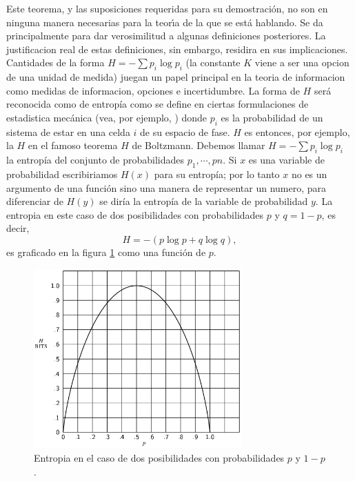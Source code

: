 Este teorema, y las suposiciones requeridas para su demostraci\'{o}n,
no son en ninguna manera necesarias para la teor\'{\i}a de la que se
est\'{a} hablando.  Se da principalmente para dar verosimilitud a
algunas definiciones posteriores. La justificacion real de estas
definiciones, sin embargo, residira en sus implicaciones. Cantidades
de la forma $H = -\sum p_{i} \log p_{i}$ (la constante $K$ viene a ser
una opcion de una unidad de medida) juegan un papel principal en la
teoria de informacion como medidas de informacion, opciones e
incertidumbre. La forma de $H$ ser\'{a} reconocida como de
entrop\'{i}a como se define en ciertas formulaciones de estadistica
mec\'{a}nica (vea, por ejemplo, \citet{tolman}) donde $p_{i}$ es la
probabilidad de un sistema de estar en una celda $i$ de su espacio de
fase. $H$ es entonces, por ejemplo, la $H$ en el famoso teorema $H$ de
Boltzmann. Debemos llamar $H = -\sum p_{i} \log{p_{i}}$ la
entrop\'{i}a del conjunto de probabilidades $p_{1}, \cdots,p{n}$. Si
$x$ es una variable de probabilidad escribiriamos $H(x)$ para su
entrop\'{i}a; por lo tanto $x$ no es un argumento de una funci\'{o}n
sino una manera de representar un numero, para diferenciar de $H(y)$
se dir\'{i}a la entrop\'{i}a de la variable de probabilidad $y$.  La
entropia en este caso de dos posibilidades con probabilidades $p$ y $q
= 1 - p$, es decir,
\begin{equation}
H = -(p \log p + q \log q),
\end{equation}
es graficado en la figura \ref{fig:7} como una funci\'{o}n de $p$.

\begin{figure}[!ht]
\centerline{\includegraphics[width=80mm]{Imagenes/SinComentarios/Pagina11-Figura7.png}}
\caption{Entropia en el caso de dos posibilidades con probabilidades
  $p$ y $1 - p$.}
\label{fig:7}
\end{figure}

